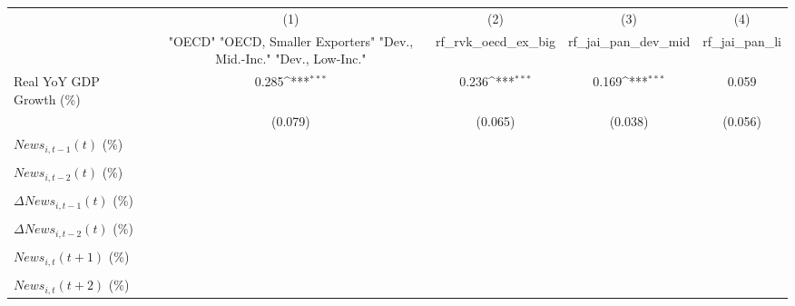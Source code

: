 {
\def\sym#1{\ifmmode^{#1}\else\(^{#1}\)\fi}
\begin{tabular}{l*{4}{c}}
\toprule
                    &\multicolumn{1}{c}{(1)}&\multicolumn{1}{c}{(2)}&\multicolumn{1}{c}{(3)}&\multicolumn{1}{c}{(4)}\\
                    &\multicolumn{1}{c}{ "OECD" "OECD, Smaller Exporters" "Dev., Mid.-Inc." "Dev., Low-Inc."}&\multicolumn{1}{c}{rf_rvk_oecd_ex_big}&\multicolumn{1}{c}{rf_jai_pan_dev_mid}&\multicolumn{1}{c}{rf_jai_pan_li}\\
\midrule
Real YoY GDP Growth (\%)&       0.285\sym{***}&       0.236\sym{***}&       0.169\sym{***}&       0.059         \\
                    &     (0.079)         &     (0.065)         &     (0.038)         &     (0.056)         \\
\addlinespace
$ News_{i,t-1}(t)$ (\%)&                     &                     &                     &                     \\
                    &                     &                     &                     &                     \\
\addlinespace
$ News_{i,t-2}(t)$ (\%)&                     &                     &                     &                     \\
                    &                     &                     &                     &                     \\
\addlinespace
$ \Delta News_{i,t-1}(t)$ (\%)&                     &                     &                     &                     \\
                    &                     &                     &                     &                     \\
\addlinespace
$ \Delta News_{i,t-2}(t)$ (\%)&                     &                     &                     &                     \\
                    &                     &                     &                     &                     \\
\addlinespace
$ News_{i,t}(t+1)$ (\%)&                     &                     &                     &                     \\
                    &                     &                     &                     &                     \\
\addlinespace
$ News_{i,t}(t+2)$ (\%)&                     &                     &                     &                     \\

\end{tabular}}
